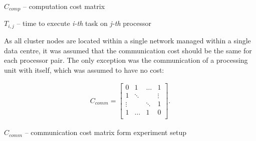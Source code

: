 \begin{center}
\medskip
\begin{minipage}{0.5\textwidth}
\small
$C_{comp}$ -- computation cost matrix

$T_{i, j}$ -- time to execute \emph{i-th} task on \emph{j-th} processor
\end{minipage}
\medskip
\end{center}
As all cluster nodes are located within a single network managed within a single data centre, it was assumed that the communication cost should be the same for each processor pair.
The only exception was the communication of a processing unit with itself, which was assumed to have no cost:


\begin{align}
C_{comm}=
\begin{bmatrix}
0 & 1 & \dots & 1\\
1 & \ddots &  & \vdots \\
\vdots &  & \ddots & 1 \\
1 & \dots & 1 & 0 \\
\end{bmatrix}.
\end{align}

\begin{center}
\medskip
\begin{minipage}{0.6\textwidth}
\small
$C_{comm}$ -- communication cost matrix form experiment setup
\end{minipage}
\medskip
\end{center}



